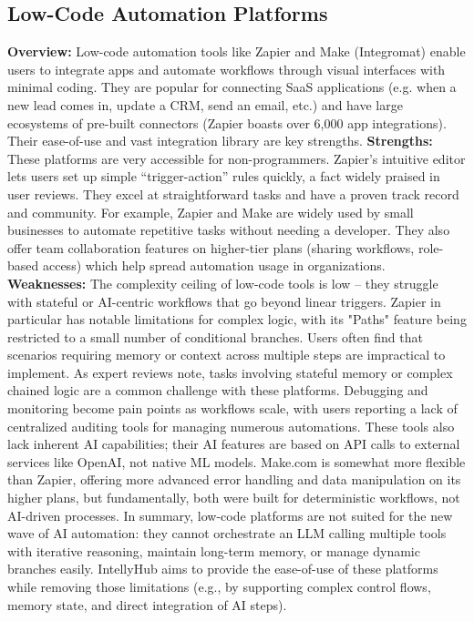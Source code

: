\documentclass[11pt, a4paper, oneside]{article}
\begin{document}
\subsection{Low-Code Automation Platforms}

\textbf{Overview:} Low-code automation tools like Zapier and Make (Integromat) enable users to integrate apps and automate workflows through visual interfaces with minimal coding. They are popular for connecting SaaS applications (e.g. when a new lead comes in, update a CRM, send an email, etc.) and have large ecosystems of pre-built connectors (Zapier boasts over 6,000 app integrations\cite{zapierApps}). Their ease-of-use and vast integration library are key strengths.
\newline\newline
\textbf{Strengths:} These platforms are very accessible for non-programmers. Zapier's intuitive editor lets users set up simple “trigger-action” rules quickly, a fact widely praised in user reviews\cite{g2ZapierReviews}. They excel at straightforward tasks and have a proven track record and community. For example, Zapier and Make are widely used by small businesses to automate repetitive tasks without needing a developer. They also offer team collaboration features on higher-tier plans (sharing workflows, role-based access) which help spread automation usage in organizations\cite{zapierPricing}.
\newline\newline
\textbf{Weaknesses:} The complexity ceiling of low-code tools is low – they struggle with stateful or AI-centric workflows that go beyond linear triggers. Zapier in particular has notable limitations for complex logic, with its "Paths" feature being restricted to a small number of conditional branches. Users often find that scenarios requiring memory or context across multiple steps are impractical to implement. As expert reviews note, tasks involving stateful memory or complex chained logic are a common challenge with these platforms. Debugging and monitoring become pain points as workflows scale, with users reporting a lack of centralized auditing tools for managing numerous automations\cite{g2ZapierReviews}. These tools also lack inherent AI capabilities; their AI features are based on API calls to external services like OpenAI, not native ML models\cite{zapierOpenAI}. Make.com is somewhat more flexible than Zapier, offering more advanced error handling and data manipulation on its higher plans\cite{g2MakeVsZapier}, but fundamentally, both were built for deterministic workflows, not AI-driven processes. In summary, low-code platforms are not suited for the new wave of AI automation: they cannot orchestrate an LLM calling multiple tools with iterative reasoning, maintain long-term memory, or manage dynamic branches easily. IntellyHub aims to provide the ease-of-use of these platforms while removing those limitations (e.g., by supporting complex control flows, memory state, and direct integration of AI steps).
\end{document}
